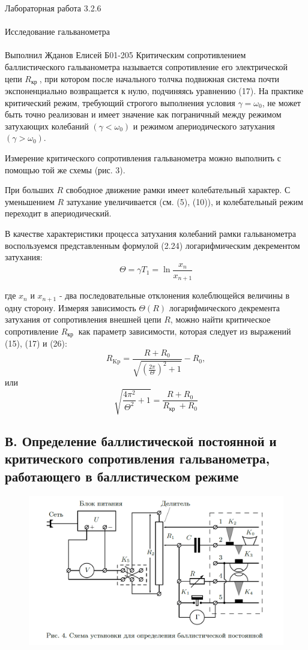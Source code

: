 \documentclass{astroedu-lab}
\begin{document}
\begin{problem}{\huge Лабораторная работа 3.2.6\\\\Исследование гальванометра\\\\Выполнил Жданов Елисей Б01-205}
Критическим сопротивлением баллистического гальванометра называется сопротивление его электрической цепи $R_{\text {кр }}$, при котором после начального толчка подвижная система почти экспоненциально возвращается к нулю, подчиняясь уравнению (17). На практике критический режим, требующий строгого выполнения условия $\gamma=\omega_0$, не может быть точно реализован и имеет значение как пограничный между режимом затухающих колебаний $\left(\gamma<\omega_0\right)$ и режимом апериодического затухания $\left(\gamma>\omega_0\right)$.

Измерение критического сопротивления гальванометра можно выполнить с помощью той же схемы (рис. 3).

При больших $R$ свободное движение рамки имеет колебательный характер. С уменьшением $R$ затухание увеличивается (см. (5), (10)), и колебательный режим переходит в апериодический.

В качестве характеристики процесса затухания колебаний рамки гальванометра воспользуемся представленным формулой (2.24) логарифмическим декрементом затухания:
$$
\Theta=\gamma T_1=\ln \frac{x_n}{x_{n+1}}
$$

где $x_n$ и $x_{n+1}$ - два последовательные отклонения колеблющейся величины в одну сторону. Измеряя зависимость $\Theta(R)$ логарифмического декремента затухания от сопротивления внешней цепи $R$, можно найти критическое сопротивление $R_{\text {кр }}$ как параметр зависимости, которая следует из выражений (15), (17) и (26):
$$
R_{\mathrm{Kp}}=\frac{R+R_0}{\sqrt{\left(\frac{2 \pi}{\Theta}\right)^2+1}}-R_0,
$$
или
$$
\sqrt{\frac{4 \pi^2}{\Theta^2}+1}=\frac{R+R_0}{R_{\text {кр }}+R_0}
$$

\subsection{В. Определение баллистической постоянной и критического сопротивления гальванометра, работающего в баллистическом режиме}

\begin{figure}[!h]
	\centering
	\includegraphics[width=1\textwidth]{уст2.png}
	\label{fig:boiler}
\end{figure}


\end{problem}
\end{document}
